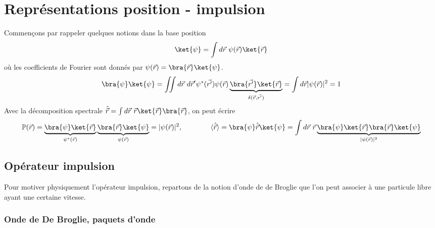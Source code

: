 \chapter{Représentations position - impulsion}
Commençons par rappeler quelques notions dans la base position
\begin{equation}
\ket{\psi} = \int d\vec r\ \psi(\vec{r})\ket{\vec{r}}
\end{equation}
où les coefficients de Fourier sont donnés par $\psi(\vec{r}) = \bra{\vec{r}}\ket{\psi}$.
\begin{equation}
\bra{\psi}\ket{\psi} = \iint d\vec r\ d\vec r'\psi^*(\vec{r'})\psi(\vec{r})\underbrace{
\bra{\vec{r'}}\ket{\vec{r}}}_{\delta(\vec{r},\vec{r'})} = \int d\vec r |\psi(\vec{r})|^2=1
\end{equation}
Avec la décomposition spectrale $\hat{\vec{r}} = \int d\vec{r}\ \vec{r}\ket{\vec{r}}\bra{\vec{r}}$, 
on peut écrire
\begin{equation}
\mathbb{P}(\vec{r}) = \underbrace{\bra{\psi}\ket{\vec{r}}}_{\psi^*(\vec{r})}\underbrace{
\bra{\vec{r}}\ket{\psi}}_{\psi(\vec{r})} = |\psi(\vec{r})|^2,\qquad\qquad\langle\hat{\vec{r}}\rangle = 
\bra{\psi}\hat{\vec{r}}\ket{\psi} = \int d\vec{r}\ \vec{r}\underbrace{\bra{\psi}\ket{\vec{r}}
\bra{\vec{r}}\ket{\psi}}_{|\psi(\vec{r})|^2}
\end{equation}

\section{Opérateur impulsion}
Pour motiver physiquement l'opérateur impulsion, repartons de la notion d'onde de de Broglie que 
l'on peut associer à une particule libre ayant une certaine vitesse. 
\subsection{Onde de De Broglie, paquets d'onde}

